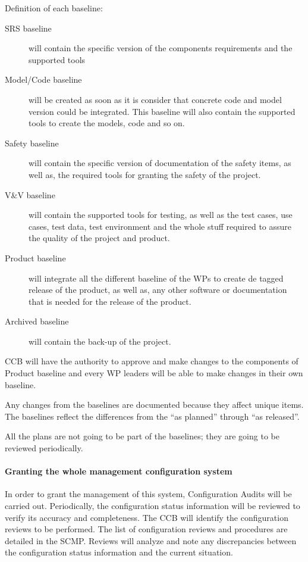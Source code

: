 \documentclass{template/openetcs_article}
\begin{document}
Definition of each baseline:
\begin{description}
\item[SRS baseline] will contain the specific version of the components requirements and the supported tools
\item[Model/Code baseline] will be created as soon as it is consider that concrete code and model version could be integrated. This baseline will also contain the supported tools to create the models, code and so on.
\item[Safety baseline] will contain the specific version of documentation of the safety items, as well as, the required tools for granting the safety of the project. 
\item[V\&V baseline] will contain the supported tools for testing, as well as the test cases, use cases, test data, test environment and the whole stuff required to assure the quality of the project and product.
\item[Product baseline] will integrate all the different baseline of the WPs to create de tagged release of the product, as well as, any other software or documentation that is needed for the release of the product.
\item[Archived baseline] will contain the back-up of the project. 
\end{description}
CCB will have the authority to approve and make changes to the components of Product baseline and every WP leaders will be able to make changes in their own baseline.

Any changes from the baselines are documented because they affect unique items. The baselines reflect the differences from the ``as planned'' through ``as released''.

All the plans are not going to be part of the baselines; they are going to be reviewed periodically.


\paragraph{Granting the whole management configuration system}

In order to grant the management of this system, Configuration Audits will be carried out. Periodically, the configuration status information will be reviewed to verify its accuracy and completeness.  The CCB will identify the configuration reviews to be performed. The list of configuration reviews and procedures are detailed in the SCMP. Reviews will analyze and note any discrepancies between the configuration status information and the current situation.
\end{document}
